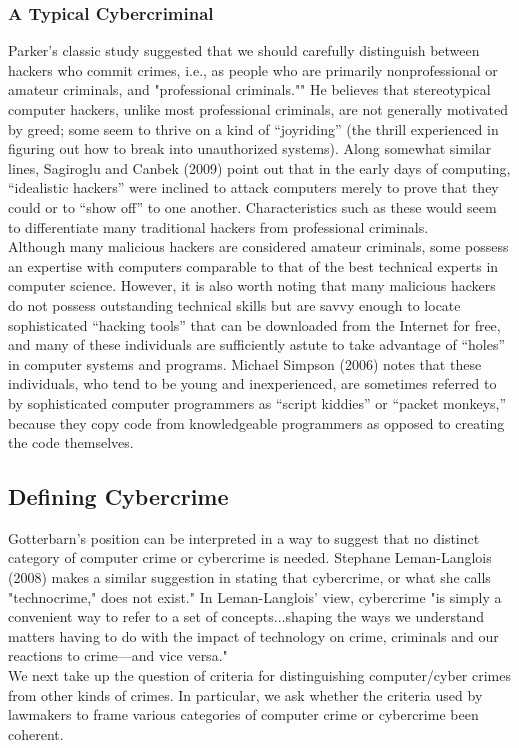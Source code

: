 \documentclass[12pt]{article}
\theoremstyle{definition}
\begin{document}
\subsubsection{A Typical Cybercriminal}
Parker’s classic study suggested that we should carefully distinguish
between hackers who commit crimes, i.e., as people who are primarily nonprofessional or
amateur criminals, and "professional criminals."" He believes that stereotypical computer
hackers, unlike most professional criminals, are not generally motivated by greed; some
seem to thrive on a kind of “joyriding” (the thrill experienced in figuring out how to break
into unauthorized systems). Along somewhat similar lines, Sagiroglu and Canbek (2009)
point out that in the early days of computing, “idealistic hackers” were inclined to attack
computers merely to prove that they could or to “show off” to one another. Characteristics
such as these would seem to differentiate many traditional hackers from professional
criminals.\\
Although many malicious hackers are considered amateur criminals, some possess
an expertise with computers comparable to that of the best technical experts in computer
science. However, it is also worth noting that many malicious hackers do not possess
outstanding technical skills but are savvy enough to locate sophisticated “hacking tools”
that can be downloaded from the Internet for free, and many of these individuals are
sufficiently astute to take advantage of “holes” in computer systems and programs.
Michael Simpson (2006) notes that these individuals, who tend to be young and
inexperienced, are sometimes referred to by sophisticated computer programmers as
“script kiddies” or “packet monkeys,” because they copy code from knowledgeable
programmers as opposed to creating the code themselves.
\subsection{Defining Cybercrime}
Gotterbarn’s position can be interpreted in a way to suggest that no distinct category
of computer crime or cybercrime is needed. Stephane Leman-Langlois (2008) makes a
similar suggestion in stating that cybercrime, or what she calls "technocrime," does not
exist." In Leman-Langlois’ view, cybercrime "is simply a convenient way to refer to a set
of concepts...shaping the ways we understand matters having to do with the impact of
technology on crime, criminals and our reactions to crime—and vice versa."\\
We next take up the question of criteria for distinguishing computer/cyber crimes
from other kinds of crimes. In particular, we ask whether the criteria used by lawmakers
to frame various categories of computer crime or cybercrime been coherent.
\end{document}
